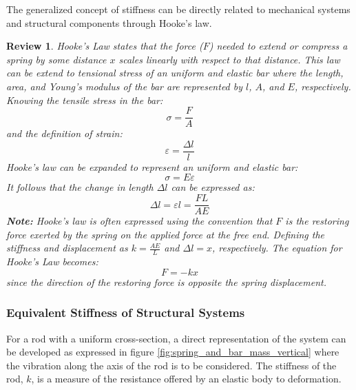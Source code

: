 \documentclass[12pt,letter]{article}
\numberwithin{ex}{section} %
\newtheorem{re}{Review}
\numberwithin{re}{section} %
\newenvironment{review}{\begin{mdframed}[middlelinewidth=2mm,roundcorner=20pt]\begin{re}\normalfont}{\end{re}\end{mdframed}}
\begin{document}
		The generalized concept of stiffness can be directly related to mechanical systems and structural components through Hooke's law. 	\begin{review}
			Hooke's Law states that the force ($F$) needed to extend or compress a spring by some distance $x$ scales linearly with respect to that distance. This law can be extend to tensional stress of an uniform and elastic bar where the length, area, and Young's modulus of the bar are represented by $l$, $A$, and $E$, respectively. Knowing the tensile stress in the bar:
			\begin{equation}
			\sigma = \frac{F}{A}
			\end{equation} 			
			and the definition of strain:
			\begin{equation}
			\varepsilon = \frac{\Delta l}{l}
			\end{equation} 			
			Hooke's law can be expanded to represent an uniform and elastic bar:
			\begin{equation}
			\sigma = E \varepsilon
			\end{equation} 			
			It follows that the change in length $\Delta l$ can be expressed as:		
			\begin{equation}
			\Delta l = \varepsilon l = \frac{F L}{A E}
			\end{equation} 
			\textbf{Note:} Hooke's law is often expressed using the convention that $F$ is the restoring force exerted by the spring on the applied force at the free end. Defining the stiffness and displacement as $k = \frac{AE}{L}$ and $\Delta l = x$, respectively. The equation for Hooke's Law becomes:
			\begin{equation}
			F = -kx
			\end{equation} 			
			since the direction of the restoring force is opposite the spring displacement.
		\end{review}
	
		\subsubsection{Equivalent Stiffness of Structural Systems}	
		
            For a rod with a uniform cross-section, a direct representation of the system can be developed as expressed in figure \ref{fig:spring_and_bar_mass_vertical} where the vibration along the axis of the rod is to be considered. The stiffness of the rod, $k$, is a measure of the resistance offered by an elastic body to deformation. 
\end{document}
